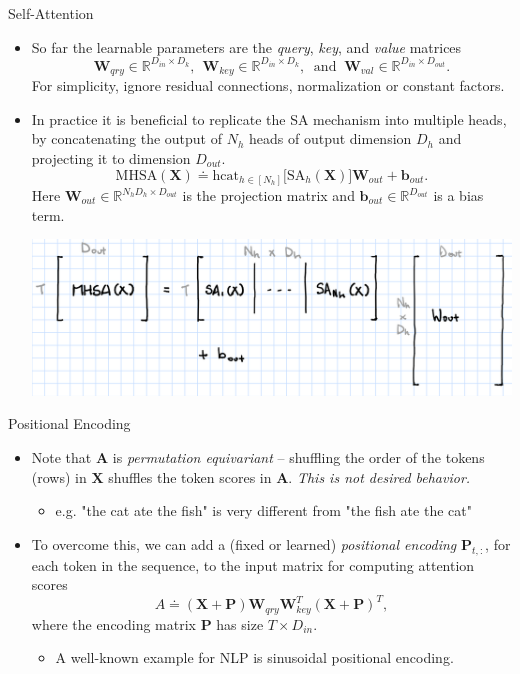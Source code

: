 \documentclass[9pt]{beamer}
\newcommand{\bb}{\mathbb}
\newcommand{\mb}{\bm}
\begin{document}
\begin{frame}{Self-Attention}
\begin{itemize}
\item So far the learnable parameters are the {\em query}, {\em key}, and {\em value} matrices
$$\mb W_{qry} \in \bb R^{D_{in}\times{D_k}}, \ \ 
\mb W_{key} \in \bb R^{D_{in}\times{D_k}},\ \text{ and } \ 
\mb W_{val} \in \bb R^{D_{in}\times{D_{out}}}.$$
For simplicity, ignore residual connections, normalization or constant factors.

\item In practice it is beneficial to replicate the SA mechanism into multiple heads, by concatenating the output of $N_h$ heads of output dimension $D_h$ and projecting it to dimension $D_{out}$.
\begin{equation}
\mathrm{MHSA}(\mb X) \doteq \mathrm{hcat}_{h\in[N_h]}\big[\mathrm{SA}_h(\mb X)\big]\mb W_{out} + \mb b_{out}. \label{mhsa}
\end{equation}
Here $\bm W_{out}\in\bb R^{N_hD_h\times D_{out}}$ is the projection matrix and $\bm  b_{out}\in\bb R^{D_{out}}$ is a bias term.

\begin{center}
    \includegraphics[width=.7\textwidth]{images/mhsa.png}
\end{center}
\end{itemize}
\end{frame}


\begin{frame}{Positional Encoding}
\begin{itemize}

\item Note that $\bm A$ is {\em permutation equivariant} -- shuffling the order of the tokens (rows) in $\bm X$ shuffles the token scores in $\bm A$. {\em This is not desired behavior.}
\begin{itemize}
    \item e.g. "the cat ate the fish" is very different from "the fish ate the cat"
\end{itemize}

\vspace{.1in}
\item To overcome this, we can add a (fixed or learned) {\em positional encoding} $\bm P_{t,:}$, for each token in the sequence, to the input matrix for computing attention scores
\begin{equation}
A \doteq (\mb X + \mb P)\mb W_{qry}\mb W_{key}^T (\mb X + \mb P)^T,
\end{equation}
where the encoding matrix $\bm P$ has size $T\times D_{in}$.
\begin{itemize}
    \item A well-known example for NLP is sinusoidal positional encoding.
\end{itemize}
\end{itemize}
\end{frame}
\end{document}

